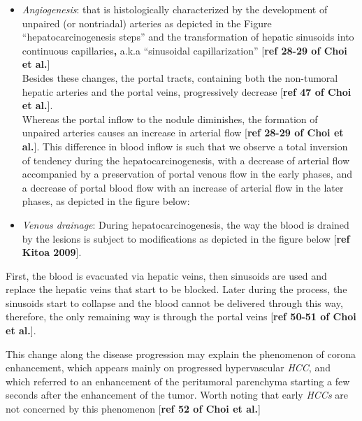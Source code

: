 \documentclass[]{article}
\providecommand{\tightlist}{%
  \setlength{\itemsep}{0pt}\setlength{\parskip}{0pt}}
\begin{document}
\begin{itemize}
\tightlist
\item
  \emph{Angiogenesis}: that is histologically characterized by the
  development of unpaired (or nontriadal) arteries as depicted in the
  Figure ``hepatocarcinogenesis steps'' and the transformation of
  hepatic sinusoids into continuous capillaries\textbf{, }a.k.a
  ``sinusoidal capillarization'' {[}\textbf{ref 28-29 of Choi et
  al.}{]}\\
  Besides these changes, the portal tracts, containing both the
  non-tumoral hepatic arteries and the portal veins, progressively
  decrease {[}\textbf{ref 47 of Choi et al.}{]}.\\
  Whereas the portal inflow to the nodule diminishes, the formation of
  unpaired arteries causes an increase in arterial flow {[}\textbf{ref
  28-29 of Choi et al.}{]}. This difference in blood inflow is such that
  we observe a total inversion of tendency during the
  hepatocarcinogenesis, with a decrease of arterial flow accompanied by
  a preservation of portal venous flow in the early phases, and a
  decrease of portal blood flow with an increase of arterial flow in the
  later phases, as depicted in the figure below:\\
\item
  \emph{Venous drainage}: During hepatocarcinogenesis, the way the blood
  is drained by the lesions is subject to modifications as depicted in
  the figure below {[}\textbf{ref Kitoa 2009}{]}.
\end{itemize}

First, the blood is evacuated via hepatic veins, then sinusoids are used
and replace the hepatic veins that start to be blocked. Later during the
process, the sinusoids start to collapse and the blood cannot be
delivered through this way, therefore, the only remaining way is through
the portal veins {[}\textbf{ref 50-51 of Choi et al.}{]}.

This change along the disease progression may explain the phenomenon of
corona enhancement, which appears mainly on progressed hypervascular
\emph{HCC}, and which referred to an enhancement of the peritumoral
parenchyma starting a few seconds after the enhancement of the tumor.
Worth noting that early \emph{HCCs} are not concerned by this phenomenon
{[}\textbf{ref 52 of Choi et al.}{]}
\end{document}
